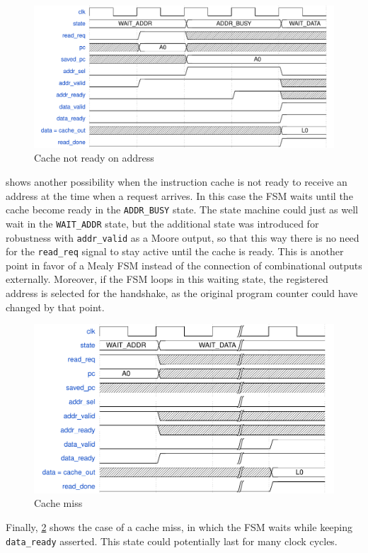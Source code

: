 \begin{figure}[hbt]
  \centering
  \includegraphics[width=\textwidth]{img/cache02.pdf}
  \caption{Cache not ready on address}
  \label{fig:cache02}
\end{figure}
 shows another possibility when the instruction cache is not ready to receive an address at the time when a request arrives. In this case the \acs{FSM} waits until the cache become ready in the \texttt{ADDR\_BUSY} state. The state machine could just as well wait in the \texttt{WAIT\_ADDR} state, but the additional state was introduced for robustness with \texttt{addr\_valid} as a Moore output, so that this way there is no need for the \texttt{read\_req} signal to stay active until the cache is ready. This is another point in favor of a Mealy \acs{FSM} instead of the connection of combinational outputs externally. Moreover, if the \acs{FSM} loops in this waiting state, the registered address is selected for the handshake, as the original program counter could have changed by that point. 

\begin{figure}[hbt]
  \centering
  \includegraphics[width=\textwidth]{img/cache03.pdf}
  \caption{Cache miss}
  \label{fig:cache03}
\end{figure}
Finally, \cref{fig:cache03} shows the case of a cache miss, in which the \acs{FSM} waits while keeping \texttt{data\_ready} asserted. This state could potentially last for many clock cycles.

